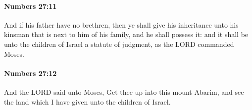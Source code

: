 		\paragraph{Numbers 27:11} %
			\label{NUMBERS-27-11}

			And if his father have no brethren, then ye shall give his inheritance unto his kinsman that is next to him of his family, and he shall possess it: and it shall be unto the children of Israel a statute of judgment, as the LORD commanded Moses.


		\paragraph{Numbers 27:12} %
			\label{NUMBERS-27-12}

			And the LORD said unto Moses, Get thee up into this mount Abarim, and see the land which I have given unto the children of Israel.

